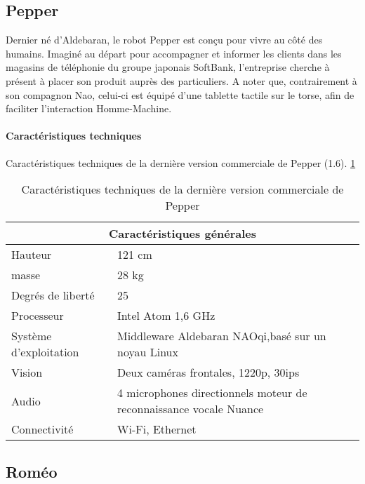 \subsection{Pepper}
\label{Entreprise: Les produits: Pepper}
Dernier né d'Aldebaran, le robot Pepper est conçu pour vivre au côté des humains. Imaginé au départ pour accompagner et informer les clients dans les magasins de téléphonie du groupe japonais SoftBank, l'entreprise cherche à présent à placer son produit auprès des particuliers. A noter que, contrairement à son compagnon Nao, celui-ci est équipé d'une tablette tactile sur le torse, afin de faciliter l'interaction Homme-Machine.

\paragraph{Caractéristiques techniques}
Caractéristiques techniques de la dernière version commerciale de Pepper (1.6). \ref{tab: Caractéristiques technique de Pepper}

\begin{table}[h]
\begin{tabular}{ | l | p{7cm} | }
	\hline
	\multicolumn{2}{|c|}{Caractéristiques générales} \\
	\hline
	Hauteur & 121 cm \\
	\hline 
	masse & 28 kg \\
	\hline 
	Degrés de liberté  & 25 \\
	\hline
	Processeur & Intel Atom 1,6 GHz \\
	\hline
	Système d'exploitation & Middleware Aldebaran NAOqi,\newline basé sur un noyau Linux \\
	\hline 
	Vision & Deux caméras frontales, 1220p, 30ips \\
	\hline
	Audio & 4 microphones directionnels \newline moteur de reconnaissance vocale Nuance  \\
	\hline
	Connectivité & Wi-Fi, Ethernet \\
	\hline
\end{tabular}
\caption[Caractéristiques technique de Pepper]{Caractéristiques techniques de la dernière version commerciale  de Pepper}
\label {tab: Caractéristiques technique de Pepper}
\end{table}

\subsection{Roméo}
\label{Entreprise: Les produits: Roméo}

